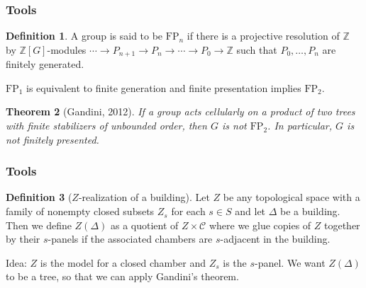 \documentclass[xcolor=dvipsnames]{beamer}
\newcommand{\Z}{\mathbb{Z}}
\newcommand{\sC}{\mathcal{C}}
\newcommand{\FP}{\mathrm{FP}}
\newtheorem{Theo}{Theorem}
\theoremstyle{definition}
\newtheorem{Defn}[Theo]{Definition}
\begin{document}
\begin{frame}
\frametitle{Tools}
\begin{Defn}
A group is said to be $\FP_n$ if there is a projective resolution of $\Z$ by $\Z[G]$-modules $\cdots \to P_{n+1}\to P_n\to \cdots \to P_0 \to \Z$ such that $P_0, \ldots, P_n$ are finitely generated.
\end{Defn}

$\FP_1$ is equivalent to finite generation and finite presentation implies $\FP_2$.


\begin{Theo}[Gandini, 2012]
If a group acts cellularly on a product of two trees with finite stabilizers of unbounded order, then $G$ is not $\FP_2$. In particular, $G$ is not finitely presented.
\end{Theo}



\end{frame}

\begin{frame}
\frametitle{Tools}


\begin{Defn}[$Z$-realization of a building]
Let $Z$ be any topological space with a family of nonempty closed subsets $Z_s$ for each $s\in S$ and let $\Delta$ be a building. Then we define $Z(\Delta)$ as a quotient of $Z\times \sC$ where we glue copies of $Z$ together by their $s$-panels if the associated chambers are $s$-adjacent in the building.
\end{Defn}
\vskip 1cm
Idea: $Z$ is the model for a closed chamber and $Z_s$ is the $s$-panel. We want $Z(\Delta)$ to be a tree, so that we can apply Gandini's theorem.
\end{frame}
\end{document}
